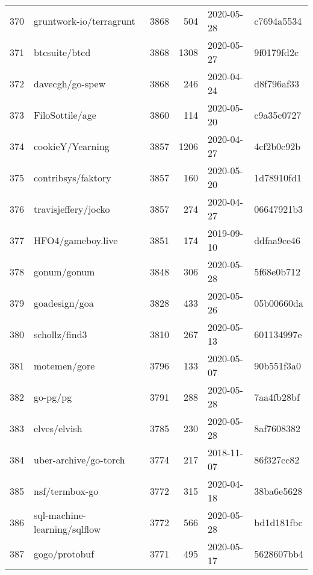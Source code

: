 \begin{longtable}{llrrll}
    370 &                            gruntwork-io/terragrunt &   3868 &    504 & 2020-05-28 &  c7694a5534 \\
    371 &                                      btcsuite/btcd &   3868 &   1308 & 2020-05-27 &  9f0179fd2c \\
    372 &                                    davecgh/go-spew &   3868 &    246 & 2020-04-24 &  d8f796af33 \\
    373 &                                    FiloSottile/age &   3860 &    114 & 2020-05-20 &  c9a35c0727 \\
    374 &                                   cookieY/Yearning &   3857 &   1206 & 2020-04-27 &  4cf2b0c92b \\
    375 &                                 contribsys/faktory &   3857 &    160 & 2020-05-20 &  1d78910fd1 \\
    376 &                                travisjeffery/jocko &   3857 &    274 & 2020-04-27 &  06647921b3 \\
    377 &                                  HFO4/gameboy.live &   3851 &    174 & 2019-09-10 &  ddfaa9ce46 \\
    378 &                                        gonum/gonum &   3848 &    306 & 2020-05-28 &  5f68e0b712 \\
    379 &                                      goadesign/goa &   3828 &    433 & 2020-05-26 &  05b00660da \\
    380 &                                      schollz/find3 &   3810 &    267 & 2020-05-13 &  601134997e \\
    381 &                                       motemen/gore &   3796 &    133 & 2020-05-07 &  90b551f3a0 \\
    382 &                                           go-pg/pg &   3791 &    288 & 2020-05-28 &  7aa4fb28bf \\
    383 &                                       elves/elvish &   3785 &    230 & 2020-05-28 &  8af7608382 \\
    384 &                              uber-archive/go-torch &   3774 &    217 & 2018-11-07 &  86f327cc82 \\
    385 &                                     nsf/termbox-go &   3772 &    315 & 2020-04-18 &  38ba6e5628 \\
    386 &                       sql-machine-learning/sqlflow &   3772 &    566 & 2020-05-28 &  bd1d181fbc \\
    387 &                                      gogo/protobuf &   3771 &    495 & 2020-05-17 &  5628607bb4 \\

\end{longtable}
